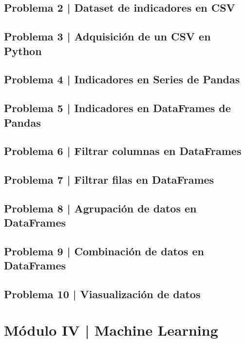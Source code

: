 \documentclass{article}
\begin{document}
\subsection*{Problema 2 | Dataset de indicadores en CSV}

\subsection*{Problema 3 | Adquisición de un CSV en Python}

\subsection*{Problema 4 | Indicadores en Series de Pandas}

\subsection*{Problema 5 | Indicadores en DataFrames de Pandas}

\subsection*{Problema 6 | Filtrar columnas en DataFrames}

\subsection*{Problema 7 | Filtrar filas en DataFrames}

\subsection*{Problema 8 | Agrupación de datos en DataFrames}

\subsection*{Problema 9 | Combinación de datos en DataFrames}

\subsection*{Problema 10 | Viasualización de datos}

\clearpage

\section*{Módulo IV | Machine Learning}
\end{document}
